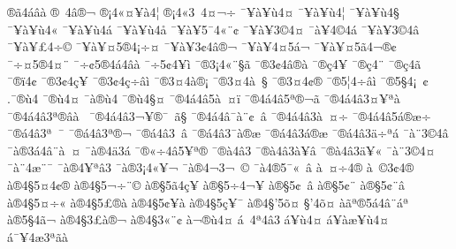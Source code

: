 {^^ae^^e34^^e1^^e2^^e0 
^^ae^^a04^^e2^^ae^^ac
^^ae^^a14^^ab^^a4^^a5^^e04^^a6
^^ae^^a14^^ab3^^a04^^a4^^ac^^f7^^ad
^^af^^a5^^e0^^a5^^f94^^a4
^^af^^a5^^e0^^a5^^f94^^a6
^^af^^a5^^e0^^a5^^f94^^a7
^^af^^a5^^e0^^a5^^f94^^ab
^^af^^a5^^e0^^a5^^f94^^e1
^^af^^a5^^e0^^a5^^f94^^e5
^^af^^a5^^e0^^a55^^af4^^ab^^a8^^a2
^^af^^a5^^e0^^a53^^a94^^a4
^^af^^e0^^a54^^a94^^e1
^^af^^a5^^e0^^a53^^a94^^e2
^^af^^a5^^e0^^a5^^a34^^ad^^f7^^a9
^^af^^a5^^e0^^a5^^a45^^ae4^^a1^^f7^^a4
^^af^^a5^^e0^^a53^^a24^^e2^^ae^^ac
^^af^^a5^^e0^^a54^^a45^^e1^^ac
^^af^^a5^^e0^^a5^^a45^^e34^^ac^^ae^^a2
^^af^^f7^^a45^^ae4^^a4^^a8^^ad
^^af^^f7^^a25^^ae4^^e14^^e2^^e0
^^af^^f75^^a24^^a5^^ad^^ec
^^af^^ae3^^a14^^ab^^a8^^a7^^e3
^^af^^ae3^^a24^^e2^^ae^^e0
^^af^^ae^^e74^^ad^^a5
^^af^^ae^^e74^^ad^^a8
^^af^^ae^^e74^^ad^^e3
^^af^^ae^^ef4^^a2
^^af^^ae3^^a24^^e7^^a5^^ad
^^af^^ae3^^a24^^e7^^f7^^e2^^ec
^^af^^ae3^^a44^^e0^^ae^^a1
^^af^^ae3^^a44^^e0^^a0^^a7
^^af^^ae3^^a44^^a2^^ae
^^af^^ae5^^a64^^ad^^f7^^e2^^ec
^^af^^ae5^^a74^^a1^^a0^^a2
.^^af^^ae^^f94
^^af^^ae^^f94^^a4
^^af^^e0^^ae^^f94
^^af^^ae^^f94^^a7^^a4
^^af^^ae4^^e14^^e25^^e0^^a0^^a4^^ef^^ad
^^af^^ae4^^e14^^e25^^aa^^ae^^ac^^e3
^^af^^ae4^^e14^^e23^^a4^^a5^^aa^^e0
^^af^^ae4^^e14^^e23^^aa^^ae^^ad^^e2^^e0^^a0
^^af^^ae4^^e14^^e23^^ac^^a5^^ad^^ae^^af^^a0^^e3^^a7
^^af^^ae4^^e14^^e2^^af^^e0^^a8^^a2^^a0^^e2
^^af^^ae4^^e14^^e23^^e0^^a0^^a4^^f7
^^af^^ae4^^e14^^e25^^e1^^ae^^e6^^f7
^^af^^ae^^e14^^e23^^aa^^a0^^af
^^af^^ae^^e14^^e23^^aa^^ae^^ac
^^af^^ae^^e14^^e23^^ad^^a0^^e2
^^af^^ae^^e14^^e23^^af^^e0^^ae^^e6
^^af^^ae^^e14^^e23^^e1^^ae^^e6
^^af^^ae^^e14^^e23^^e4^^f7^^aa^^e1
^^af^^e0^^a83^^a94^^e2
^^af^^e0^^ae3^^e14^^e2^^a8^^e0^^a0^^a4
^^af^^e0^^ae4^^e43^^e1
^^af^^ae^^ab^^f74^^e25^^a5^^aa^^ae^^ad
^^af^^ae^^e04^^e23^^ad
^^af^^ae^^e04^^e23^^e0^^a5^^e2
^^af^^ae^^e04^^e23^^e4^^a5^^ab
^^af^^e0^^a83^^a94^^a4
^^af^^e0^^a84^^ad^^e6^^a8^^af
^^af^^e0^^ae4^^a5^^aa^^e23^^ad
^^af^^e0^^ae3^^a14^^ab^^a5^^ac
^^af^^e0^^ae4^^ac3^^ac^^a0^^a9
^^af^^e04^^ae5^^af^^ab^^a0^^e2
^^e0^^a0^^a4^^f74^^ae
^^e0^^a0^^a93^^a24^^ad^^ae
^^e0^^ae4^^a75^^a44^^a2^^ae
^^e0^^ae4^^a75^^ac^^f7^^ad^^ad^^a8^^a9
^^e0^^ae^^a75^^e34^^e7^^a5^^ad
^^e0^^ae^^a75^^f74^^ac^^a5^^ad
^^e0^^ae^^a75^^a2^^a0^^ad^^e2
^^e0^^ae^^a75^^a2^^a8^^ad
^^e0^^ae^^a75^^a2^^a8^^e2
^^e0^^ae4^^a75^^a4^^f7^^ab
^^e0^^ae4^^a75^^a3^^ae^^e0
^^e0^^ae4^^a75^^a2^^a5^^e0
^^e0^^ae4^^a75^^e7^^a5^^af
^^e0^^ae4^^a7'5^^f5^^a4^^ad
^^a7'4^^f5^^a4^^ad
^^e0^^e3^^aa^^ae5^^e14^^e2^^a8^^e1^^aa
^^e0^^ae5^^a74^^e3^^ac
^^e0^^ae4^^a73^^a3^^e0^^ae^^ac
^^e0^^ae4^^a73^^ab^^a8^^a2
^^e0^^ac^^ae^^f94^^a4
^^e1^^a0^^ad4^^aa4^^e23
^^e1^^a5^^f94^^a4
^^e1^^a5^^e0^^e6^^a5^^f94^^a4
^^e1^^af^^a54^^e63^^aa^^e3^^e0
}
